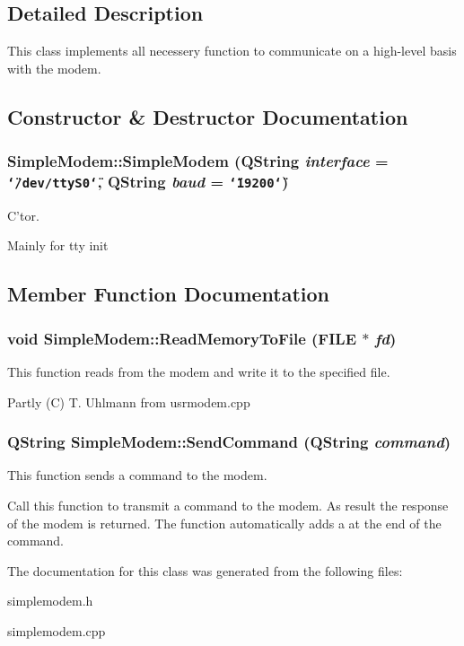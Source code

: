 \subsection{Detailed Description}
This class implements all necessery function to communicate on a high-level basis with the modem. 



\subsection{Constructor \& Destructor Documentation}
\subsubsection{\setlength{\rightskip}{0pt plus 5cm}Simple\-Modem::Simple\-Modem (QString {\em interface} = {\tt \char`\"{}/dev/ttyS0\char`\"{}}, QString {\em baud} = {\tt \char`\"{}19200\char`\"{}})}\label{classSimpleModem_a0}


C'tor. 

Mainly for tty init 

\subsection{Member Function Documentation}
\subsubsection{\setlength{\rightskip}{0pt plus 5cm}void Simple\-Modem::Read\-Memory\-To\-File (FILE $\ast$ {\em fd})}\label{classSimpleModem_a3}


This function reads from the modem and write it to the specified file. 

Partly (C) T. Uhlmann from usrmodem.cpp 
\subsubsection{\setlength{\rightskip}{0pt plus 5cm}QString Simple\-Modem::Send\-Command (QString {\em command})}\label{classSimpleModem_a2}


This function sends a command to the modem. 

Call this function to transmit a command to the modem. As result the response of the modem is returned. The function automatically adds a  at the end of the command. 

The documentation for this class was generated from the following files:\begin{CompactItemize}
\item 
simplemodem.h\item 
simplemodem.cpp\end{CompactItemize}
